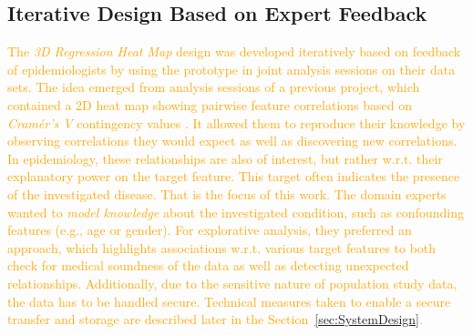 \documentclass[journal]{style/vgtc} 			          %
\newcommand{\design}[1]{\textcolor{orange}{#1}}
\begin{document}
\subsection{Iterative Design Based on Expert Feedback}
\design{
The \emph{3D Regression Heat Map} design was developed iteratively based on feedback of epidemiologists by using the prototype in joint analysis sessions on their data sets.
The idea emerged from analysis sessions of a previous project, which contained a 2D heat map showing pairwise feature correlations based on \emph{Cram\'{e}r's V} contingency values \cite{Klemm2014VIS}.
It allowed them to reproduce their knowledge by observing correlations they would expect as well as discovering new correlations.
In epidemiology, these relationships are also of interest, but rather w.r.t. their explanatory power on the target feature.
This target often indicates the presence of the investigated disease.
That is the focus of this work.
The domain experts wanted to \emph{model knowledge} about the investigated condition, such as confounding features (e.g., age or gender).
For explorative analysis, they preferred an approach, which highlights associations w.r.t. various target features to both check for medical soundness of the data as well as detecting unexpected relationships.
Additionally, due to the sensitive nature of population study data, the data has to be handled secure.
Technical measures taken to enable a secure transfer and storage are described later in the Section~\ref{sec:SystemDesign}.
}
\end{document}
